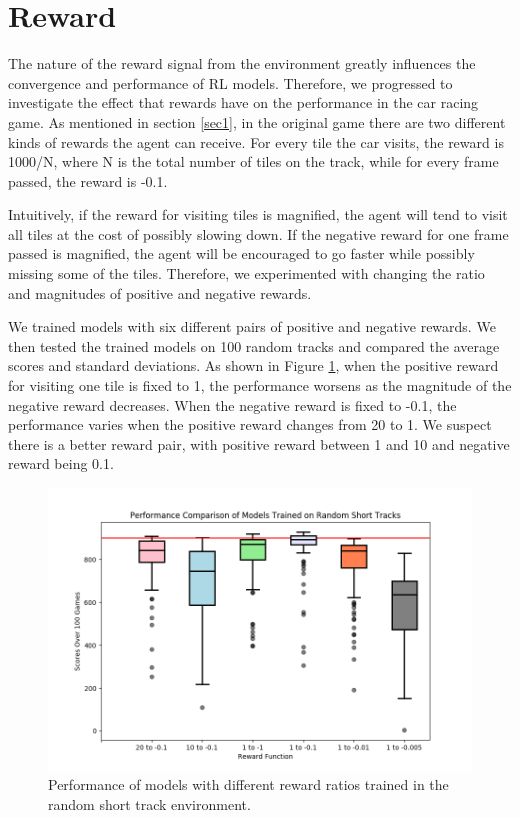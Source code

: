 \section{Reward}
The nature of the reward signal from the environment greatly influences the convergence and performance of RL models. Therefore, we progressed to investigate the effect that rewards have on the performance in the car racing game. As mentioned in section \ref{sec1}, in the original game there are two different kinds of rewards the agent can receive. For every tile the car visits, the reward is 1000/N, where N is the total number of tiles on the track, while for every frame passed, the reward is -0.1. 
\par
Intuitively, if the reward for visiting tiles is magnified, the agent will tend to visit all tiles at the cost of possibly slowing down. If the negative reward for one frame passed is magnified, the agent will be encouraged to go faster while possibly missing some of the tiles. Therefore, we experimented with changing the ratio and magnitudes of positive and negative rewards. 
\par 
We trained models with six different pairs of positive and negative rewards. We then tested the trained models on 100 random tracks and compared the average scores and standard deviations. As shown in Figure \ref{fig:rewardclip}, when the positive reward for visiting one tile is fixed to 1, the performance worsens as the magnitude of the negative reward decreases. When the negative reward is fixed to -0.1, the performance varies when the positive reward changes from 20 to 1. We suspect there is a better reward pair, with positive reward between 1 and 10 and negative reward being 0.1. 
\newpage
\begin{figure}[h!]
\centering\includegraphics[scale=0.5,clip]{Graphics/performance_clip_reward.png}
\caption[Clip Reward Performance]{Performance of models with different reward ratios trained in the random short track environment.}\label{fig:rewardclip}
\end{figure}

\endinput


